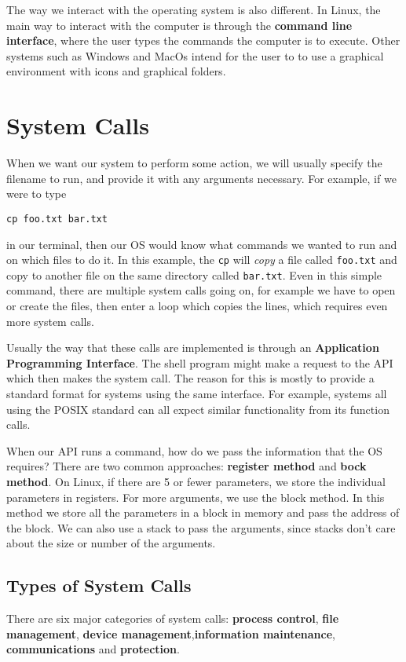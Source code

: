 \documentclass{tufte-handout}
\begin{document}
The way we interact with the operating system is also different. In Linux, the main 
way to interact with the computer is through the \textbf{command line interface}, 
where the user types the commands the computer is to execute. Other systems such as
Windows and MacOs intend for the user to to use a graphical environment with icons 
and graphical folders.

\section{System Calls}
When we want our system to perform some action, we will usually specify the filename
to run, and provide it with any arguments necessary. For example, if we were to type

\begin{center}
		\texttt{cp foo.txt bar.txt}
\end{center}
in our terminal, then our OS would know what commands we wanted to run and on which
files to do it. In this example, the \texttt{cp} will \textit{copy} a file 
called \texttt{foo.txt} and copy to another file on the same directory called 
\texttt{bar.txt}.
Even in this simple command, there are multiple system calls going on,
for example we have to open or create the files, then enter a loop which copies the 
lines, which requires even more system calls.

Usually the way that these calls are implemented is through an 
\textbf{Application Programming Interface}. The shell program might make a request to 
the API which then makes the system call. The reason for this is mostly to provide a 
standard format for systems using the same interface. For example, systems all using
the POSIX standard can all expect similar functionality from its function calls.

When our API runs a command, how do we pass the information that the OS requires?
There are two common approaches: \textbf{register method} and \textbf{bock method}.
On Linux, if there are 5 or fewer parameters, we store the individual parameters in 
registers. For more arguments, we use the block method. In this method we store all the
parameters in a block in memory and pass the address of the block. We can also use 
a stack to pass the arguments, since stacks don't care about the size or number
of the arguments.

\subsection{Types of System Calls}
There are six major categories of system calls: \textbf{process control}, 
\textbf{file management}, \textbf{device management},\textbf{information maintenance},
\textbf{communications} and \textbf{protection}.
\end{document}

